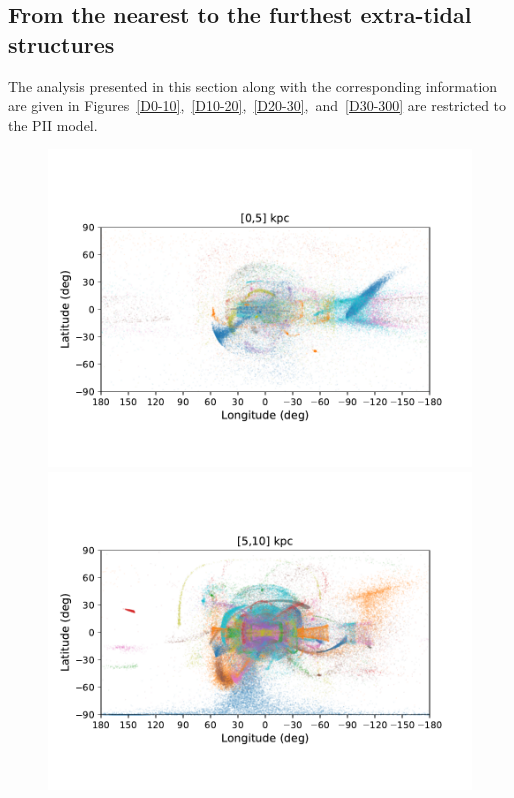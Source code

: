     \subsection{From the nearest to the furthest extra-tidal structures}\label{streamvsD}

    The analysis presented in this section along with the corresponding information are given in Figures~\ref{D0-10},~\ref{D10-20},~\ref{D20-30},~and~\ref{D30-300} are restricted to the PII model.

    \twocolumn
    \begin{figure}[h!]
        \begin{center}
            \includegraphics[clip=true, trim = 0mm 15mm 0mm 20mm, width=0.9\columnwidth]{images/PII_ensemble_LB_D0-5_scatter.pdf}
            \includegraphics[clip=true, trim = 0mm 15mm 0mm 20mm, width=0.9\columnwidth]{images/PII_ensemble_LB_D5-10_scatter.pdf}


\end{center}
\end{figure}
